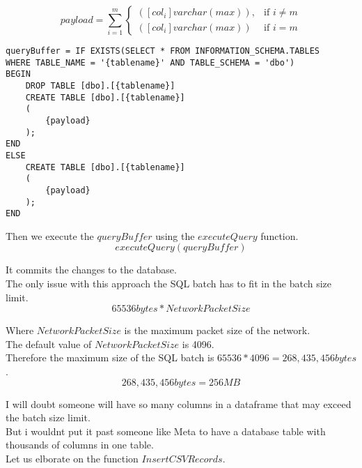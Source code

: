 \begin{equation}
payload = \sum_{i=1}^{m} 
\begin{cases}
    ([col_{i}] varchar(max)), & \text{if } i \neq m \\
    ([col_{i}] varchar(max)) & \text{if } i = m    
\end{cases}
\end{equation}

\begin{verbatim} 
queryBuffer = IF EXISTS(SELECT * FROM INFORMATION_SCHEMA.TABLES 
WHERE TABLE_NAME = '{tablename}' AND TABLE_SCHEMA = 'dbo')
BEGIN
    DROP TABLE [dbo].[{tablename}]
    CREATE TABLE [dbo].[{tablename}]
    (
        {payload}
    );
END
ELSE
    CREATE TABLE [dbo].[{tablename}]
    (
        {payload}
    );
END
\end{verbatim}

Then we execute the $queryBuffer$ using the $executeQuery$ function. \\
\begin{equation}
    executeQuery(queryBuffer)
\end{equation}

It commits the changes to the database. \\

The only issue with this approach the SQL batch has to fit in the batch size limit. \\
\begin{equation}
    65536 bytes * NetworkPacketSize
\end{equation}

Where $NetworkPacketSize$ is the maximum packet size of the network. \\

The default value of $NetworkPacketSize$ is 4096. \\

Therefore the maximum size of the SQL batch is $65536 * 4096 = 268,435,456 bytes$. \\
\begin{equation}
    268,435,456 bytes = 256 MB
\end{equation}

I will doubt someone will have so many columns in a dataframe that may exceed the batch size limit. \\
But i wouldnt put it past someone like Meta to have a database table with thousands of columns in one table. \\

Let us elborate on the function $InsertCSVRecords$. \\


